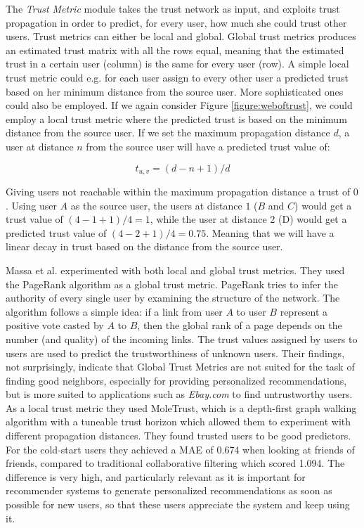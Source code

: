 The \emph{Trust Metric} module takes the trust network as input, and exploits
trust propagation in order to predict, for every user, how much she could trust
other users. Trust metrics can either be local and global. Global trust metrics
produces an estimated trust matrix with all the rows equal, meaning that the
estimated trust in a certain user (column) is the same for every user (row). A
simple local trust metric could e.g. for each user assign to every other user a
predicted trust based on her minimum distance from the source user. More
sophisticated ones could also be employed. If we again consider Figure
\ref{figure:weboftrust}, we could employ a local trust metric where the
predicted trust is based on the minimum distance from the source user. If we
set the maximum propagation distance $d$, a user at distance $n$ from the
source user will have a predicted trust value of:

\begin{equation}
t_{u,v} = (d-n+1)/d
\end{equation}

Giving users not reachable within the maximum propagation distance a trust of
$0$. Using user $A$ as the source user, the users at distance $1$ ($B$ and $C$)
would get a trust value of $(4-1+1)/4 = 1$, while the user at distance 2 (D)
would get a predicted trust value of $(4-2+1)/4 = 0.75$. Meaning that we will
have a linear decay in trust based on the distance from the source user.

Massa et al. \cite{Massa2007} experimented with both local and global trust
metrics. They used the PageRank algorithm as a global trust metric. PageRank
tries to infer the authority of every single user by examining the structure of
the network. The algorithm follows a simple idea: if a link from user $A$ to
user $B$ represent a positive vote casted by $A$ to $B$, then the global rank
of a page depends on the number (and quality) of the incoming links. The trust
values assigned by users to users are used to predict the trustworthiness of
unknown users. Their findings, not surprisingly, indicate that Global Trust
Metrics are not suited for the task of finding good neighbors, especially for
providing personalized recommendations, but is more suited to applications such
as \emph{Ebay.com} to find untrustworthy users. As a local trust metric they
used MoleTrust, which is a depth-first graph walking algorithm with a tuneable
trust horizon which allowed them to experiment with different propagation
distances. They found trusted users to be good predictors. For the cold-start
users they achieved a MAE of 0.674 when looking at friends of friends, compared
to traditional collaborative filtering which scored 1.094. The difference is
very high, and particularly relevant as it is important for recommender systems
to generate personalized recommendations as soon as possible for new users, so
that these users appreciate the system and keep using it.

